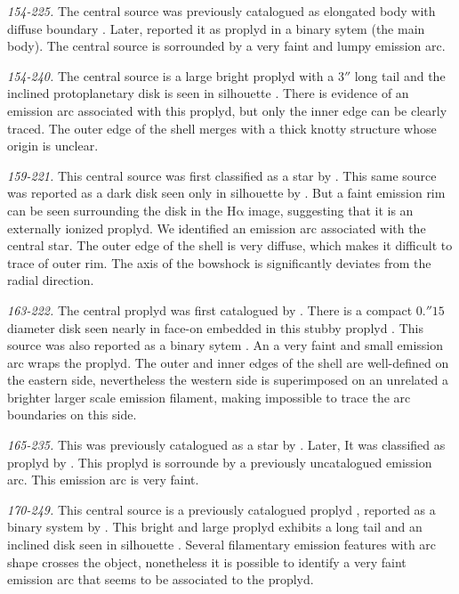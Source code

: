\documentclass[apj, twocolumn]{aastex63}
\newcommand\ha{\ensuremath{\mathrm{H\alpha}}}
\begin{document}
\textit{154-225.} The central source was previously catalogued
as elongated body with diffuse boundary \citep{ODell:1996a}.
Later, \citet{Ricci:2008a} reported it as proplyd in a binary
sytem (the main body). The central source is sorrounded by a
very faint and lumpy emission arc.

\textit{154-240.} The central source is a large bright
proplyd \cite{Bally:2000a, Ricci:2008a} with a \(3''\)
long tail and the inclined protoplanetary disk is seen
in silhouette \citep{Bally:2000a}. There is evidence of
an emission arc associated with this proplyd, but only
the inner edge can be clearly traced. The outer edge of
the shell merges with a thick knotty structure whose origin
is unclear.

\textit{159-221.} This central source was first classified as
a star by \citet{ODell:1996a}. This same source was reported as
a dark disk seen only in silhouette by \citet{Ricci:2008a}.
But a faint emission rim can be seen surrounding the disk in
the \ha{} image, suggesting that it is an externally ionized
proplyd. We identified an emission arc associated with the
central star. The outer edge of the shell is very diffuse,
which  makes it difficult to trace of outer rim. The axis of
the bowshock is significantly deviates from the radial
direction.

\textit{163-222.} The central proplyd was first catalogued
by \citet{ODell:1996a}. There is a compact \(0.''15\) diameter
disk seen nearly in face-on embedded in this stubby
proplyd \citep{Bally:2000a, Ricci:2008a}.  This source
was also reported as a binary sytem \citep{Ricci:2008a}.
An a very faint and small emission arc wraps the proplyd.
The outer and inner edges of the shell are well-defined on
the eastern side, nevertheless the western side is superimposed
on an unrelated a brighter larger scale emission filament,
making impossible to trace the arc boundaries on this side.

\textit{165-235.} This was previously catalogued as a star
by \citet{ODell:1996a}. Later, It was classified as proplyd
by \citet{Ricci:2008a}. This proplyd is sorrounde by a
previously uncatalogued emission arc. This emission arc is
very faint.


\textit{170-249.} This central source is a previously
catalogued proplyd \citep{ODell:1996a}, reported as a
binary system by \citet{Ricci:2008a}. This bright and
large proplyd exhibits a long tail and an inclined disk
seen in silhouette \citep{Bally:2000a}. Several
filamentary emission features with arc shape crosses the
object, nonetheless it is possible to identify a very faint
emission arc that seems to be associated to the proplyd.  
\end{document}
